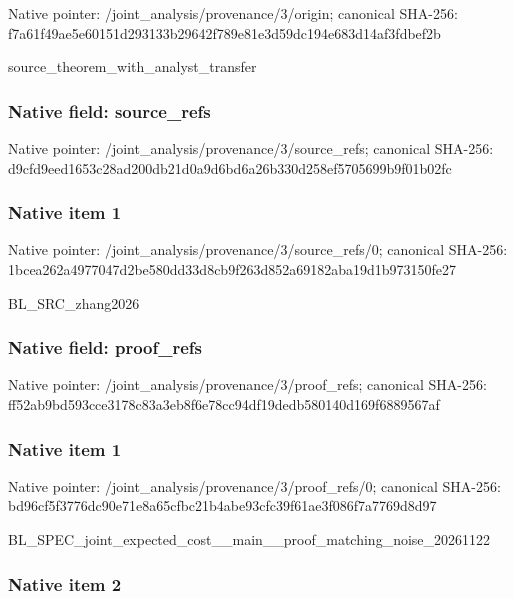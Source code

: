 \documentclass[10pt,a4paper]{article}
\begin{document}
Native pointer: /joint\_analysis/provenance/3/origin; canonical SHA-256: f7a61f49ae5e60151d293133\allowbreak{}b29642f789e81e3d59dc194e\allowbreak{}683d14af3fdbef2b


source\_theorem\_with\_analyst\_transfer


\subsubsection{Native field: source\_refs}


Native pointer: /joint\_analysis/provenan\allowbreak{}ce/3/source\_refs; canonical SHA-256: d9cfd9eed1653c28ad200db2\allowbreak{}1d0a9d6bd6a26b330d258ef5\allowbreak{}705699b9f01b02fc



\subsubsection{Native item 1}


Native pointer: /joint\_analysis/provenan\allowbreak{}ce/3/source\_refs/0; canonical SHA-256: 1bcea262a4977047d2be580d\allowbreak{}d33d8cb9f263d852a69182ab\allowbreak{}a19d1b973150fe27


BL\_SRC\_zhang2026


\subsubsection{Native field: proof\_refs}


Native pointer: /joint\_analysis/provenance/3/proof\_refs; canonical SHA-256: ff52ab9bd593cce3178c83a3\allowbreak{}eb8f6e78cc94df19dedb5801\allowbreak{}40d169f6889567af



\subsubsection{Native item 1}


Native pointer: /joint\_analysis/provenan\allowbreak{}ce/3/proof\_refs/0; canonical SHA-256: bd96cf5f3776dc90e71e8a65\allowbreak{}cfbc21b4abe93cfc39f61ae3\allowbreak{}f086f7a7769d8d97


BL\_SPEC\_joint\_expected\_c\allowbreak{}ost\_\_main\_\_proof\_matchin\allowbreak{}g\_noise\_20261122


\subsubsection{Native item 2}
\end{document}

